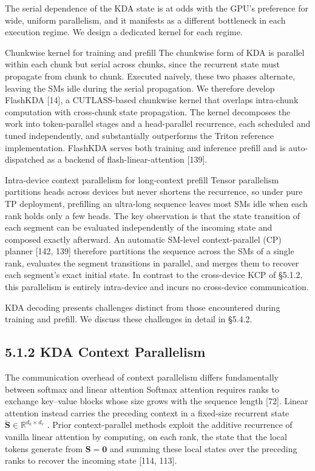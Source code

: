 \documentclass[
  10
]{article}
\begin{document}
The serial dependence of the KDA state is at odds with the GPU's
preference for wide, uniform parallelism, and it manifests as a
different bottleneck in each execution regime. We design a dedicated
kernel for each regime.

Chunkwise kernel for training and prefill The chunkwise form of KDA is
parallel within each chunk but serial across chunks, since the recurrent
state must propagate from chunk to chunk. Executed naively, these two
phases alternate, leaving the SMs idle during the serial propagation. We
therefore develop FlashKDA {[}14{]}, a CUTLASS-based chunkwise kernel
that overlaps intra-chunk computation with cross-chunk state
propagation. The kernel decomposes the work into token-parallel stages
and a head-parallel recurrence, each scheduled and tuned independently,
and substantially outperforms the Triton reference implementation.
FlashKDA serves both training and inference prefill and is
auto-dispatched as a backend of flash-linear-attention {[}139{]}.

Intra-device context parallelism for long-context prefill Tensor
parallelism partitions heads across devices but never shortens the
recurrence, so under pure TP deployment, prefilling an ultra-long
sequence leaves most SMs idle when each rank holds only a few heads. The
key observation is that the state transition of each segment can be
evaluated independently of the incoming state and composed exactly
afterward. An automatic SM-level context-parallel (CP) planner {[}142,
139{]} therefore partitions the sequence across the SMs of a single
rank, evaluates the segment transitions in parallel, and merges them to
recover each segment's exact initial state. In contrast to the
cross-device KCP of §5.1.2, this parallelism is entirely intra-device
and incurs no cross-device communication.

KDA decoding presents challenges distinct from those encountered during
training and prefill. We discuss these challenges in detail in §5.4.2.

\subsection{5.1.2 KDA Context
Parallelism}\label{kda-context-parallelism}

The communication overhead of context parallelism differs fundamentally
between softmax and linear attention Softmax attention requires ranks to
exchange key--value blocks whose size grows with the sequence length
{[}72{]}. Linear attention instead carries the preceding context in a
fixed-size recurrent state
\(\breve { \mathbf { S } } \in \mathbb { R } ^ { d _ { k } \times d _ { v } }\)
. Prior context-parallel methods exploit the additive recurrence of
vanilla linear attention by computing, on each rank, the state that the
local tokens generate from \(\mathbf { S } = \mathbf { 0 }\) and summing
these local states over the preceding ranks to recover the incoming
state {[}114, 113{]}.
\end{document}
